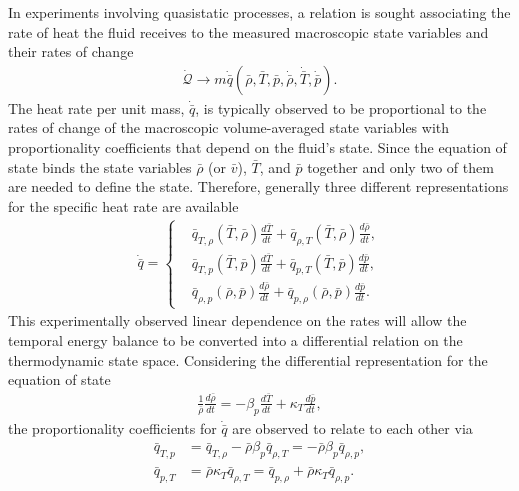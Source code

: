 In experiments involving quasistatic processes, a relation is sought associating the rate of heat the fluid receives to the measured macroscopic state variables and their rates of change
\begin{align}
    \dot{\mathcal{Q}}\to m \dot{\bar{q}}(\bar{\rho},\bar{T},\bar{p},\dot{\bar{\rho}},\dot{\bar{T}},\dot{\bar{p}}).
\end{align}
The heat rate per unit mass, $\dot{\bar{q}}$, is typically observed to be proportional to the rates of change of the macroscopic volume-averaged state variables with proportionality coefficients that depend on the fluid's state. Since the equation of state binds the state variables $\bar{\rho}$ (or $\bar{v}$), $\bar{T}$, and $\bar{p}$ together and only two of them are needed to define the state. Therefore, generally three different representations for the specific heat rate are available
\begin{align}
    \dot{\bar{q}}=\left\{\begin{aligned}
        &\bar{q}_{T,\rho}(\bar{T},\bar{\rho})\frac{d\bar{T}}{dt}+\bar{q}_{\rho,T}(\bar{T},\bar{\rho})\frac{d\bar{\rho}}{dt},\\
        &\bar{q}_{T,p}(\bar{T},\bar{p})\frac{d\bar{T}}{dt}+\bar{q}_{p,T}(\bar{T},\bar{p})\frac{d\bar{p}}{dt},\\
        &\bar{q}_{\rho,p}(\bar{\rho},\bar{p})\frac{d\bar{\rho}}{dt}+\bar{q}_{p,\rho}(\bar{\rho},\bar{p})\frac{d\bar{p}}{dt}.
    \end{aligned}\right.
\end{align}
This experimentally observed linear dependence on the rates will allow the temporal energy balance to be converted into a differential relation on the thermodynamic state space. Considering the differential representation for the equation of state
\begin{align}\label{eq:differential-equation-of-state}
    \frac{1}{\bar{\rho}}\frac{d\bar{\rho}}{dt}=-\beta_p\frac{d\bar{T}}{dt}+\kappa_T\frac{d\bar{p}}{dt},
\end{align}
the proportionality coefficients for $\dot{\bar{q}}$ are observed to relate to each other via
\begin{align}\label{eq:q-Tp-relations}
    \bar{q}_{T,p}&=\bar{q}_{T,\rho}-\bar{\rho}\beta_p\bar{q}_{\rho,T}=-\bar{\rho}\beta_p\bar{q}_{\rho,p},\\
    \label{eq:q-pT-relations}
    \bar{q}_{p,T}&=\bar{\rho}\kappa_T\bar{q}_{\rho,T}=\bar{q}_{p,\rho}+\bar{\rho}\kappa_T\bar{q}_{\rho,p}.
\end{align}

